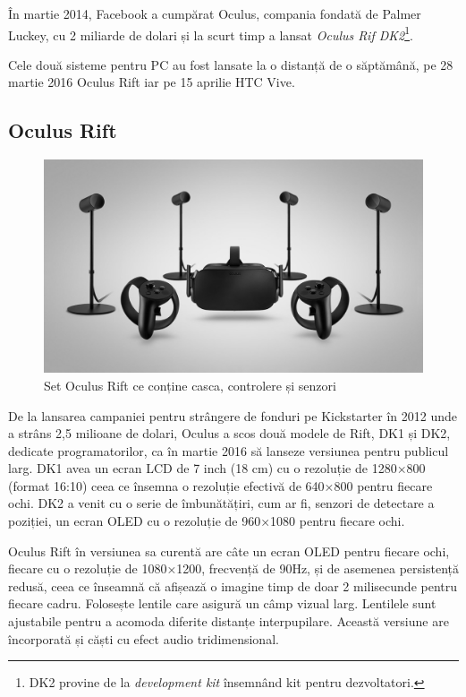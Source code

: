În martie 2014, Facebook a cumpărat Oculus, compania fondată de Palmer Luckey, cu 2 miliarde de dolari și la scurt timp a lansat \textit{Oculus Rif DK2}\footnote{DK2 provine de la \textit{development kit} însemnând kit pentru dezvoltatori.}.

Cele două sisteme pentru PC au fost lansate la o distanță de o săptămână, pe 28 martie 2016 Oculus Rift iar pe 15 aprilie HTC Vive.
\newpage

\subsection{Oculus Rift}

\begin{figure}[h]
  \centering
  \includegraphics[scale=0.35]{img/oculusRift.jpg}
  \caption{Set Oculus Rift ce conține casca, controlere și senzori}
\end{figure}

De la lansarea campaniei pentru strângere de fonduri pe Kickstarter în 2012 unde a strâns 2,5 milioane de dolari, Oculus a scos două modele de Rift, DK1 și DK2, dedicate programatorilor, ca în martie 2016 să lanseze versiunea pentru publicul larg.
DK1 avea un ecran LCD de 7 inch (18 cm) cu o rezoluție de 1280×800 (format 16:10) ceea ce însemna o rezoluție efectivă de  640×800 pentru fiecare ochi.
DK2 a venit cu o serie de îmbunătățiri, cum ar fi, senzori de detectare a poziției, un ecran OLED cu o rezoluție de 960×1080 pentru fiecare ochi.

Oculus Rift în versiunea sa curentă are câte un ecran OLED pentru fiecare ochi, fiecare cu o rezoluție de 1080×1200, frecvență de 90Hz, și de asemenea persistență redusă, ceea ce înseamnă că afișează o imagine timp de doar 2 milisecunde pentru fiecare cadru.
Folosește lentile care asigură un câmp vizual larg. Lentilele sunt ajustabile pentru a acomoda diferite distanțe interpupilare. Această versiune are încorporată și căști cu efect audio tridimensional.

